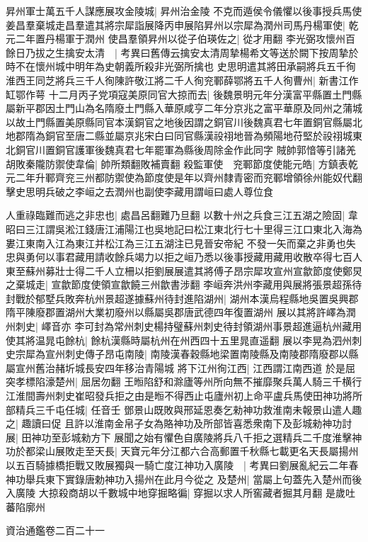 昇州軍士萬五千人謀應展攻金陵城|{
	昇州治金陵}
不克而遁侯令儀懼以後事授兵馬使姜昌羣棄城走昌羣遣其將宗犀詣展降丙申展陷昇州以宗犀為潤州司馬丹楊軍使|{
	乾元二年置丹楊軍于潤州}
使昌羣領昇州以從子伯瑛佐之|{
	從才用翻}
李光弼攻懷州百餘日乃拔之生擒安太清　|{
	考異曰舊傳云擒安太清周摯楊希文等送於闕下按周摯於時不在懷州城中明年為史朝義所殺非光弼所擒也}
史思明遣其將田承嗣將兵五千徇淮西王同芝將兵三千人徇陳許敬江將二千人徇兖鄆薛鄂將五千人徇曹州|{
	新書江作缸鄂作萼}
十二月丙子党項寇美原同官大掠而去|{
	後魏景明元年分漢富平縣置土門縣屬新平郡因土門山為名隋廢土門縣入華原咸亨二年分京兆之富平華原及同州之蒲城以故土門縣置美原縣同官本漢銅官之地後因謂之銅官川後魏真君七年置銅官縣屬北地郡隋為銅官至唐二縣並屬京兆宋白曰同官縣漢祋祤地晉為頻陽地苻堅於祋祤城東北銅官川置銅官護軍後魏真君七年罷軍為縣後周除金作此同字}
賊帥郭愔等引諸羌胡敗秦隴防禦使韋倫|{
	帥所類翻敗補賣翻}
殺監軍使　兖鄆節度使能元皓|{
	方鎮表乾元二年升鄆齊兖三州都防禦使為節度使是年以齊州隸青密而兖鄆增領徐州能奴代翻}
擊史思明兵破之李峘之去潤州也副使李藏用謂峘曰處人尊位食

人重祿臨難而逃之非忠也|{
	處昌呂翻難乃旦翻}
以數十州之兵食三江五湖之險固|{
	韋昭曰三江謂吳淞江錢唐江浦陽江也吳地記曰松江東北行七十里得三江口東北入海為婁江東南入江為東江并松江為三江五湖注已見晉安帝紀}
不發一矢而棄之非勇也失忠與勇何以事君藏用請收餘兵竭力以拒之峘乃悉以後事授藏用藏用收散卒得七百人東至蘇州募壯士得二千人立柵以拒劉展展遣其將傅子昂宗犀攻宣州宣歙節度使鄭炅之棄城走|{
	宣歙節度使領宣歙饒三州歙書涉翻}
李峘奔洪州李藏用與展將張景超孫待封戰於郁墅兵敗奔杭州景超遂據蘇州待封進陷湖州|{
	湖州本漢烏程縣地吳置吳興郡隋平陳廢郡置湖州大業初廢州以縣屬吳郡唐武德四年復置湖州}
展以其將許嶧為潤州刺史|{
	嶧音亦}
李可封為常州刺史楊持璧蘇州刺史待封領湖州事景超進逼杭州藏用使其將温晁屯餘杭|{
	餘杭漢縣時屬杭州在州西四十五里晁直遥翻}
展以李晃為泗州刺史宗犀為宣州刺史傳子昂屯南陵|{
	南陵漢春穀縣地梁置南陵縣及南陵郡隋廢郡以縣屬宣州舊治赭圻城長安四年移治青陽城}
將下江州徇江西|{
	江西謂江南西道}
於是屈突孝標陷濠楚州|{
	屈居勿翻}
王暅陷舒和滁廬等州所向無不摧靡聚兵萬人騎三千横行江淮間壽州刺史崔昭發兵拒之由是暅不得西止屯廬州初上命平盧兵馬使田神功將所部精兵三千屯任城|{
	任音壬}
鄧景山既敗與邢延恩奏乞勑神功救淮南未報景山遣人趣之|{
	趣讀曰促}
且許以淮南金帛子女為賂神功及所部皆喜悉衆南下及彭城勑神功討展|{
	田神功至彭城勑方下}
展聞之始有懼色自廣陵將兵八千拒之選精兵二千度淮擊神功於都梁山展敗走至天長|{
	天寶元年分江都六合高郵置千秋縣七載更名天長屬揚州}
以五百騎據橋拒戰又敗展獨與一騎亡度江神功入廣陵　|{
	考異曰劉展亂紀云二年春神功舉兵東下實錄唐勅神功入揚州在此月今從之}
及楚州|{
	當屬上句蓋先入楚州而後入廣陵}
大掠殺商胡以千數城中地穿掘略徧|{
	穿掘以求人所窖藏者掘其月翻}
是歲吐蕃陷廓州

資治通鑑卷二百二十一
